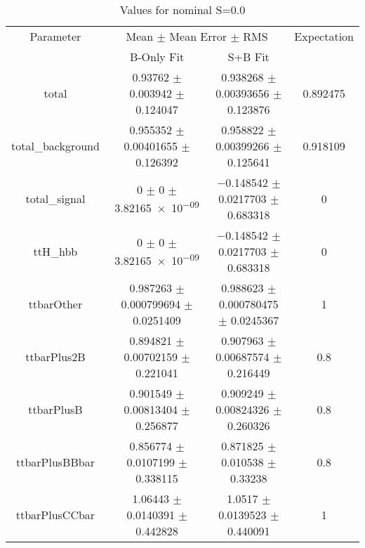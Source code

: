 \begin{table}
\centering
\caption{Values for nominal S=0.0}
\begin{tabular}{cccc}
\toprule
Parameter & \multicolumn{2}{c}{Mean $\pm$ Mean Error $\pm$ RMS} & Expectation\\
 & B-Only Fit & S+B Fit & \\
\midrule
total & \num{0.93762} $\pm$ \num{0.003942} $\pm$ \num{0.124047} & \num{0.938268} $\pm$ \num{0.00393656} $\pm$ \num{0.123876} & \num{0.892475}\\
total\_background & \num{0.955352} $\pm$ \num{0.00401655} $\pm$ \num{0.126392} & \num{0.958822} $\pm$ \num{0.00399266} $\pm$ \num{0.125641} & \num{0.918109}\\
total\_signal & \num{0} $\pm$ \num{0} $\pm$ \num{3.82165e-09} & \num{-0.148542} $\pm$ \num{0.0217703} $\pm$ \num{0.683318} & \num{0}\\
ttH\_hbb & \num{0} $\pm$ \num{0} $\pm$ \num{3.82165e-09} & \num{-0.148542} $\pm$ \num{0.0217703} $\pm$ \num{0.683318} & \num{0}\\
ttbarOther & \num{0.987263} $\pm$ \num{0.000799694} $\pm$ \num{0.0251409} & \num{0.988623} $\pm$ \num{0.000780475} $\pm$ \num{0.0245367} & \num{1}\\
ttbarPlus2B & \num{0.894821} $\pm$ \num{0.00702159} $\pm$ \num{0.221041} & \num{0.907963} $\pm$ \num{0.00687574} $\pm$ \num{0.216449} & \num{0.8}\\
ttbarPlusB & \num{0.901549} $\pm$ \num{0.00813404} $\pm$ \num{0.256877} & \num{0.909249} $\pm$ \num{0.00824326} $\pm$ \num{0.260326} & \num{0.8}\\
ttbarPlusBBbar & \num{0.856774} $\pm$ \num{0.0107199} $\pm$ \num{0.338115} & \num{0.871825} $\pm$ \num{0.010538} $\pm$ \num{0.33238} & \num{0.8}\\
ttbarPlusCCbar & \num{1.06443} $\pm$ \num{0.0140391} $\pm$ \num{0.442828} & \num{1.0517} $\pm$ \num{0.0139523} $\pm$ \num{0.440091} & \num{1}\\
\bottomrule
\end{tabular}
\end{table}